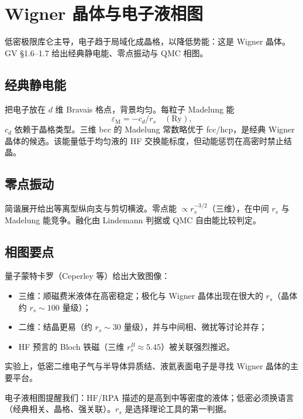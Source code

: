 \section{Wigner 晶体与电子液相图}

低密极限库仑主导，电子趋于局域化成晶格，以降低势能：这是 Wigner 晶体。GV §1.6--1.7 给出经典静电能、零点振动与 QMC 相图。

\subsection{经典静电能}

把电子放在 $d$ 维 Bravais 格点，背景均匀。每粒子 Madelung 能
\begin{equation}
  \varepsilon_{\mathrm{M}}
  =-c_d/r_s\quad(\mathrm{Ry}),
\end{equation}
$c_d$ 依赖于晶格类型。三维 bcc 的 Madelung 常数略优于 fcc/hcp，是经典 Wigner 晶体的候选。该能量低于均匀液的 HF 交换能标度，但动能惩罚在高密时禁止结晶。

\subsection{零点振动}

简谐展开给出等离型纵向支与剪切横波。零点能 $\propto r_s^{-3/2}$（三维），在中间 $r_s$ 与 Madelung 能竞争。融化由 Lindemann 判据或 QMC 自由能比较判定。

\subsection{相图要点}

量子蒙特卡罗（Ceperley 等）给出大致图像：
\begin{itemize}
  \item 三维：顺磁费米液体在高密稳定；极化与 Wigner 晶体出现在很大的 $r_s$（晶体约 $r_s\sim100$ 量级）；
  \item 二维：结晶更易（约 $r_s\sim30$ 量级），并与中间相、微扰等讨论并存；
  \item HF 预言的 Bloch 铁磁（三维 $r_s^B\approx5.45$）被关联强烈推迟。
\end{itemize}
实验上，低密二维电子气与半导体异质结、液氦表面电子是寻找 Wigner 晶体的主要平台。

\begin{note}
电子液相图提醒我们：HF/RPA 描述的是高到中等密度的液体；低密必须换语言（经典相关、晶格、强关联）。$r_s$ 是选择理论工具的第一判据。
\end{note}
